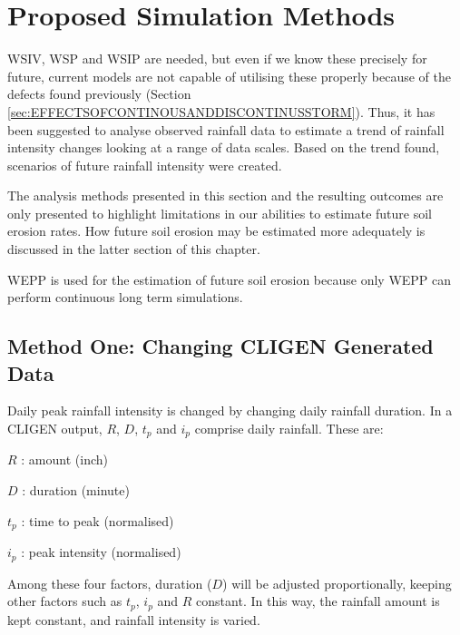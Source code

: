 

\section{Proposed Simulation Methods}
\label{sec:ProposedSimulationMethods}

WSIV, WSP and WSIP are needed, but even if we know these precisely for future,
current models are not capable of utilising these properly because of the
defects found previously (Section
\ref{sec:EFFECTSOFCONTINOUSANDDISCONTINUSSTORM}). Thus, it has been suggested to
analyse observed rainfall data to estimate a trend of rainfall intensity changes
looking at a range of data scales. Based on the trend found, scenarios of future
rainfall intensity were created.

The analysis methods presented in this section and the resulting outcomes are
only presented to highlight limitations in our abilities to estimate future soil
erosion rates. How future soil erosion may be estimated more adequately is
discussed in the latter section of this chapter.

WEPP is used for the estimation of future soil erosion because only WEPP can
perform continuous long term simulations.

\subsection{Method One: Changing CLIGEN Generated Data}
\label{sec:MethodOne}

Daily peak rainfall intensity is changed by changing daily rainfall duration.
In a CLIGEN output, $R$, $D$, $t_p$ and $i_p$ comprise daily rainfall. These
are:
\begin{itemize*}
  \item $R$ : amount (inch)
  \item $D$ : duration (minute)
  \item $t_p$ : time to peak (normalised)
  \item $i_p$ : peak intensity (normalised)
\end{itemize*}
Among these four factors, duration ($D$) will be adjusted proportionally,
keeping other factors such as $t_p$, $i_p$ and $R$ constant. In this way, the
rainfall amount is kept constant, and rainfall intensity is varied.

